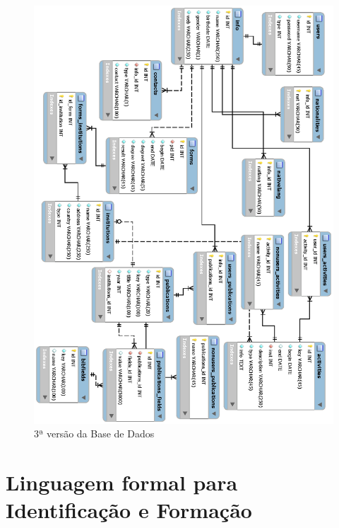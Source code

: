 \documentclass[a4paper,11pt,openright,openbib]{article}
\begin{document}
\begin{figure}[!ht]
\centering
\includegraphics[scale=1]{bd3.eps}
\caption{3ª versão da Base de Dados}
\label{fig:basededados3}
\end{figure}
\section{Linguagem formal para Identificação e Formação}
\end{document}
